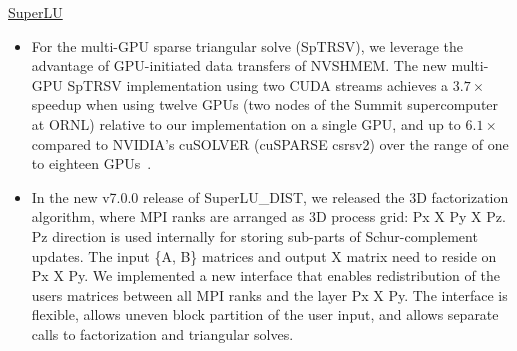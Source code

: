 \underline{SuperLU}
\begin{itemize}
\item For the multi-GPU sparse triangular solve (SpTRSV), we leverage the advantage of
  GPU-initiated data transfers of NVSHMEM.
  The new  multi-GPU SpTRSV implementation using two CUDA streams
  achieves a $3.7\times$ speedup when using twelve GPUs (two nodes of the Summit
  supercomputer at ORNL) relative to our implementation on a single GPU, and
  up to $6.1\times$ compared to NVIDIA's cuSOLVER (cuSPARSE csrsv2) over the range of
  one to eighteen GPUs~\cite{Sptrsv-nvshmem}.
\item In the new v7.0.0 release of SuperLU\_DIST, we released the 3D factorization algorithm,
  where MPI ranks are arranged as 3D process grid: Px X Py X Pz.  Pz direction is used
  internally for storing sub-parts of Schur-complement updates. The input \{A, B\} matrices and
  output X matrix need to reside on Px X Py. We implemented a new interface that enables
  redistribution of the users matrices between all MPI ranks and the layer Px X Py.
  The interface is flexible, allows uneven block partition of the user input, and allows separate
  calls to factorization and triangular solves.
\end{itemize}

\ignore{
\vspace{-.13in}
\begin{figure}[htb]
\end{figure}
} %


